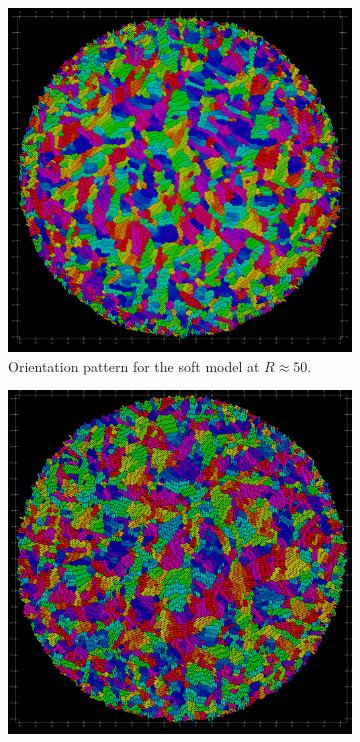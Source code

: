 \documentclass[conference]{IEEEtran}
\begin{document}
\begin{figure}[H]
    \centering
    \begin{subfigure}[b]{0.49\columnwidth}
        \centering
        \includegraphics[width=\linewidth]{figures/orientation_comparisons/r50_soft_e-2.jpeg}
        \caption{Orientation pattern for the soft model at $R \approx 50$.}
    \end{subfigure}
    \begin{subfigure}[b]{0.49\columnwidth}
        \centering
        \includegraphics[width=\linewidth]{figures/orientation_comparisons/r50_hard_e-2.jpeg}

\end{subfigure}
\end{figure}
\end{document}
